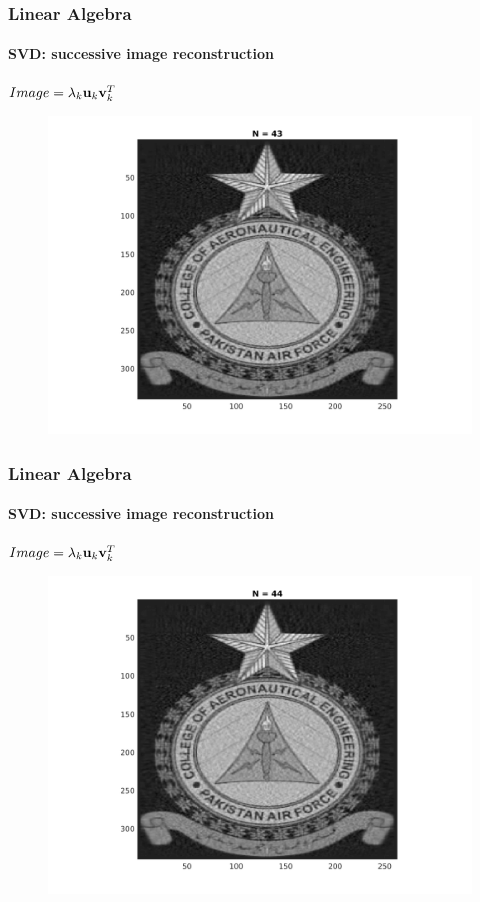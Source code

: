 \documentclass[hyperref={pdfpagelabels=true}]{beamer}
\begin{document}
\begin{frame}
\frametitle{Linear Algebra}
\framesubtitle{SVD: successive image reconstruction} 
\small{
\begin{center}
$Image = \lambda_k{\bf u}_k {\bf v}_k^T$
\end{center}}
\begin{figure}[!htb]
\centering
\includegraphics [scale=0.48]{n/b43.png}
\end{figure}
\end{frame}

\begin{frame}
\frametitle{Linear Algebra}
\framesubtitle{SVD: successive image reconstruction} 
\small{
\begin{center}
$Image = \lambda_k{\bf u}_k {\bf v}_k^T$
\end{center}}
\begin{figure}[!htb]
\centering
\includegraphics [scale=0.48]{n/b44.png}
\end{figure}
\end{frame}
\end{document}
